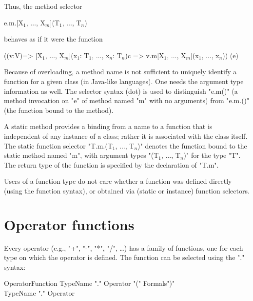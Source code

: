 Thus, the method selector

\begin{xtenmath}
e.m.[X$_1$, $\dots$, X$_m$](T$_1$, $\dots$, T$_n$)
\end{xtenmath}
\noindent behaves as if it were the function
\begin{xtenmath}
((v:V)=>
  [X$_1$, $\dots$, X$_m$](x$_1$: T$_1$, $\dots$, x$_n$: T$_n$){c} 
  => v.m[X$_1$, $\dots$, X$_m$](x$_1$, $\dots$, x$_n$))
(e)
\end{xtenmath}



Because of overloading, a method name is not sufficient to
uniquely identify a function for a given class (in Java-like languages).
One needs the argument type information as well.
The selector syntax (dot) is used to distinguish \xcd"e.m()" (a
method invocation on \xcd"e" of method named \xcd"m" with no arguments)
from \xcd"e.m.()"
(the function bound to the method). 

A static method provides a binding from a name to a function that is
independent of any instance of a class; rather it is associated with the
class itself. The static function selector
\xcdmath"T.m.(T$_1$, $\dots$, T$_n$)" denotes the
function bound to the static method named \xcd"m", with argument types
\xcdmath"(T$_1$, $\dots$, T$_n$)" for the type \xcd"T". The return type
of the function is specified by the declaration of \xcd"T.m".

Users of a function type do not care whether a function was defined
directly (using the function syntax), or obtained via (static or
instance) function selectors.


\section{Operator functions}
\label{OperatorFunction}
Every operator (e.g.,
\xcd"+",
\xcd"-",
\xcd"*",
\xcd"/",
\dots) has a family of functions, one for
each type on which the operator is defined. The function can be
selected using the "." syntax:

\begin{grammar}
OperatorFunction
        \: TypeName \xcd"." Operator \xcd"(" Formals\opt \xcd")" \\
        \| TypeName \xcd"." Operator \\
\end{grammar}

